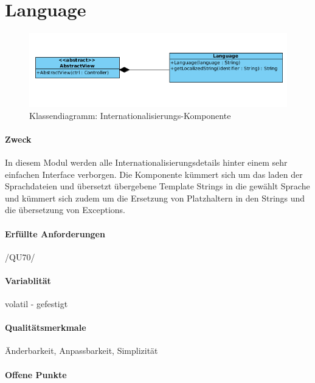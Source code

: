 \section{Language}
\label{sec:4:pakdef}
\begin{figure}[H]
\includegraphics[width=15cm]{images/Language.png}
\centering
\caption{Klassendiagramm: Internationalisierungs-Komponente}
\label{uml_controller}
\end{figure}

\paragraph{Zweck}
In diesem Modul werden alle Internationalisierungsdetails hinter einem sehr einfachen Interface verborgen.
Die Komponente kümmert sich um das laden der Sprachdateien und übersetzt übergebene Template Strings 
in die gewählt Sprache und kümmert sich zudem um die Ersetzung von Platzhaltern in den Strings und
die übersetzung von Exceptions.
\paragraph{Erfüllte Anforderungen}
/QU70/
\paragraph{Variablität}
volatil - gefestigt
\paragraph{Qualitätsmerkmale}
Änderbarkeit, Anpassbarkeit, Simplizität
\paragraph{Offene Punkte}

